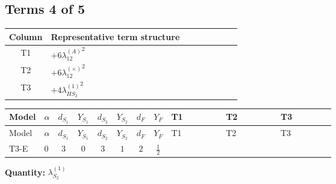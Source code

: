 \documentclass[8pt]{article}
\begin{document}
\begin{landscape}
\subsection*{Terms 4 of 5}
\begin{center}
\begin{tabular}{@{}c >{\raggedright\arraybackslash}p{0.82\linewidth}@{}}
\toprule
Column & Representative term structure \\
\midrule
T1 & \(\displaystyle +6 {\lambda_{12}^{(A)}}^2\) \\
\midrule
T2 & \(\displaystyle +6 {\lambda_{12}^{(\times)}}^2\) \\
\midrule
T3 & \(\displaystyle +4 {\lambda_{HS_2}^{(1)}}^2\) \\
\midrule
\bottomrule
\end{tabular}
\end{center}
\smallskip
\tiny
\begin{longtable}{@{}llcccccc >{\raggedright\arraybackslash}p{0.21\linewidth} >{\raggedright\arraybackslash}p{0.21\linewidth} >{\raggedright\arraybackslash}p{0.21\linewidth}@{}}
\toprule
Model & $\alpha$ & $d_{S_1}$ & $Y_{S_1}$ & $d_{S_2}$ & $Y_{S_2}$ & $d_F$ & $Y_F$ & T1 & T2 & T3 \\
\midrule
\endfirsthead
\toprule
Model & $\alpha$ & $d_{S_1}$ & $Y_{S_1}$ & $d_{S_2}$ & $Y_{S_2}$ & $d_F$ & $Y_F$ & T1 & T2 & T3 \\
\midrule
\endhead
T3-E & $0$ & $3$ & $0$ & $3$ & $1$ & $2$ & $\frac{1}{2}$ & \scriptsize\adjustbox{max width=\linewidth}{$\begin{gathered} +6 {\lambda_{12}^{(A)}}^2\end{gathered}$} & \scriptsize\adjustbox{max width=\linewidth}{$\begin{gathered} +6 {\lambda_{12}^{(\times)}}^2\end{gathered}$} & \scriptsize\adjustbox{max width=\linewidth}{$\begin{gathered} +4 {\lambda_{HS_2}^{(1)}}^2\end{gathered}$} \\
\midrule
\bottomrule
\end{longtable}
\clearpage
\noindent\textbf{Quantity: }$\lambda_{S_2}^{(1)}$\par\smallskip

\end{landscape}
\end{document}
